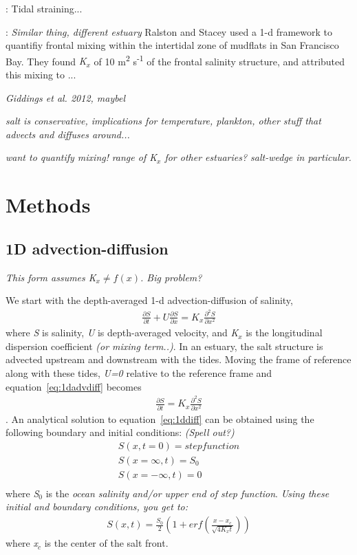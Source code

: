 \parencite{Simpson:1990aa}: Tidal straining... 

\parencite{Ralston:2005aa}: \emph{Similar thing, different estuary}
Ralston and Stacey \cite{Ralston:2005aa} used a 1-d framework to quantifiy frontal mixing within the intertidal zone of mudflats in San Francisco Bay. They found \emph{K$_x$} of 10 m\textsuperscript{2} s\textsuperscript{-1} of the frontal salinity structure, and attributed this mixing to ...

\emph{Giddings et al. 2012, maybel } 


\emph{salt is conservative, implications for temperature, plankton, other stuff that advects and diffuses around...}

\emph{want to quantify mixing!}
\emph{range of K$_x$ for other estuaries? salt-wedge in particular. }

\section{Methods} \label{sec:ch4methods}

\subsection{1D advection-diffusion} \label{ssec:1dadvdif}

\emph{This form assumes K$_x \ne f(x)$. Big problem?}

We start with the depth-averaged 1-d advection-diffusion of salinity,
\begin{eqnarray}
\frac{\partial S}{\partial t} + U\frac{\partial S}{\partial x} = K_x\frac{\partial^2S}{\partial x^2} \label{eq:1dadvdiff}
\end{eqnarray}
where \emph{S} is salinity, \emph{U} is depth-averaged velocity, and \emph{K$_x$} is the longitudinal dispersion coefficient \emph{(or mixing term..)}. In an estuary, the salt structure is advected upstream and downstream with the tides. Moving the frame of reference along with these tides, \emph{U=0} relative to the reference frame and equation~\ref{eq:1dadvdiff} becomes
\begin{eqnarray}
\frac{\partial S}{\partial t} = K_x\frac{\partial^2S}{\partial x^2} \label{eq:1ddiff}
\end{eqnarray}
. An analytical solution to equation~\ref{eq:1ddiff} can be obtained using the following boundary and initial conditions: \emph{(Spell out?)}
\begin{eqnarray}
S(x,t=0) = step function\label{eq:1ddiffIC}\\
S(x=\infty,t) = S_0\label{eq:1ddiffBC1}\\
S(x=-\infty,t) = 0\label{eq:1ddiffBC2}\\
\end{eqnarray}
where \emph{S$_0$} is the \emph{ocean salinity and/or upper end of step function}. \emph{Using these initial and boundary conditions, you get to:}
\begin{eqnarray}
S(x,t) = \frac{S_0}{2}\left(1+erf\left(\frac{x-x_c}{\sqrt{4K_xt}}\right)\right) \label{eq:S}
\end{eqnarray}
where \emph{x$_c$} is the center of the salt front. 


